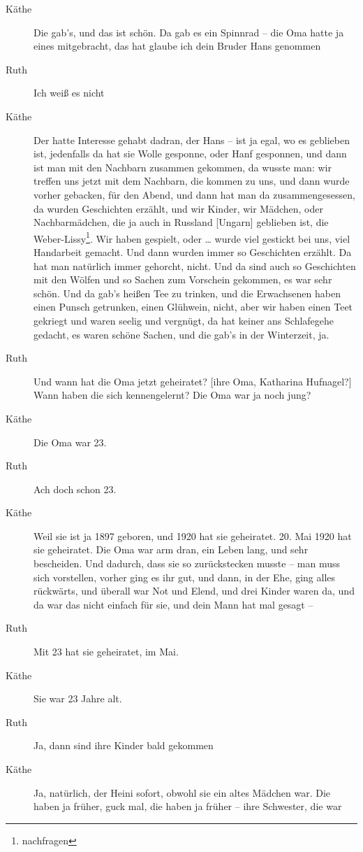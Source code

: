 \documentclass[ngerman,]{article}
\begin{document}
\begin{multicols}{2}
\begin{description}
\item[Käthe]
Die gab's, und das ist schön. Da gab es ein Spinnrad – die Oma hatte ja
eines mitgebracht, das hat glaube ich dein Bruder Hans genommen
\item[Ruth]
Ich weiß es nicht
\item[Käthe]
Der hatte Interesse gehabt dadran, der Hans – ist ja egal, wo es
geblieben ist, jedenfalls da hat sie Wolle gesponne, oder Hanf
gesponnen, und dann ist man mit den Nachbarn zusammen gekommen, da
wusste man: wir treffen uns jetzt mit dem Nachbarn, die kommen zu uns,
und dann wurde vorher gebacken, für den Abend, und dann hat man da
zusammengesessen, da wurden Geschichten erzählt, und wir Kinder, wir
Mädchen, oder Nachbarmädchen, die ja auch in Russland {[}Ungarn{]}
geblieben ist, die Weber-Lissy\footnote{nachfragen}. Wir haben gespielt,
oder \ldots{} wurde viel gestickt bei uns, viel Handarbeit gemacht. Und
dann wurden immer so Geschichten erzählt. Da hat man natürlich immer
gehorcht, nicht. Und da sind auch so Geschichten mit den Wölfen und so
Sachen zum Vorschein gekommen, es war sehr schön. Und da gab's heißen
Tee zu trinken, und die Erwachsenen haben einen Punsch getrunken, einen
Glühwein, nicht, aber wir haben einen Teet gekriegt und waren seelig und
vergnügt, da hat keiner ans Schlafegehe gedacht, es waren schöne Sachen,
und die gab's in der Winterzeit, ja.
\item[Ruth]
Und wann hat die Oma jetzt geheiratet? {[}ihre Oma, Katharina
Hufnagel?{]} Wann haben die sich kennengelernt? Die Oma war ja noch
jung?
\item[Käthe]
Die Oma war 23.
\item[Ruth]
Ach doch schon 23.
\item[Käthe]
Weil sie ist ja 1897 geboren, und 1920 hat sie geheiratet. 20. Mai 1920
hat sie geheiratet. Die Oma war arm dran, ein Leben lang, und sehr
bescheiden. Und dadurch, dass sie so zurückstecken musste – man muss
sich vorstellen, vorher ging es ihr gut, und dann, in der Ehe, ging
alles rückwärts, und überall war Not und Elend, und drei Kinder waren
da, und da war das nicht einfach für sie, und dein Mann hat mal gesagt –
\item[Ruth]
Mit 23 hat sie geheiratet, im Mai.
\item[Käthe]
Sie war 23 Jahre alt.
\item[Ruth]
Ja, dann sind ihre Kinder bald gekommen
\item[Käthe]
Ja, natürlich, der Heini sofort, obwohl sie ein altes Mädchen war. Die
haben ja früher, guck mal, die haben ja früher – ihre Schwester, die war

\end{description}
\end{multicols}
\end{document}
